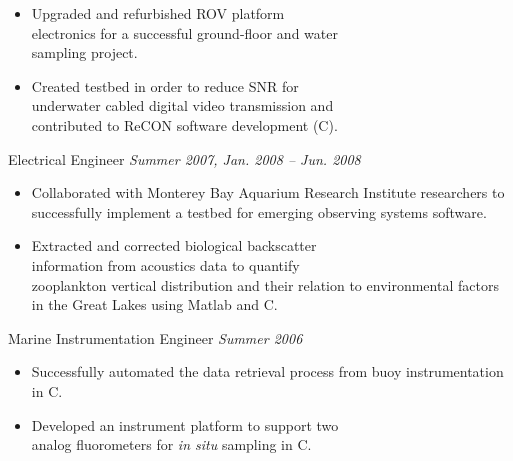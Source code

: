 \documentclass{article}
\begin{document}
{\begin{multicols}{2}
                \begin{itemize}[noitemsep,nolistsep]
                	\item Upgraded and refurbished ROV platform \\electronics for a successful ground-floor and water \\sampling project.
                	\item Created testbed in order to reduce SNR for \\underwater cabled digital video transmission and \\contributed to ReCON software development (C).
                \end{itemize}
                \vspace{5px}
                Electrical Engineer  \hfill \textsl{Summer 2007, Jan. 2008 -- Jun. 2008}  \\
                \vspace{ -10px}	
                \begin{itemize}[noitemsep,nolistsep]
                	\item Collaborated with Monterey Bay Aquarium Research Institute researchers to successfully implement a testbed for emerging observing systems software.
                	\item Extracted and corrected biological backscatter \\information from acoustics data to quantify \\zooplankton vertical distribution and their relation to environmental factors in the Great Lakes using Matlab and C.
                \end{itemize}
                \vspace{5px}
                Marine Instrumentation Engineer \hfill \textsl{Summer 2006} \\
                \vspace{ -10px}	
                \begin{itemize}[noitemsep,nolistsep]
                	\item Successfully automated the data retrieval process from buoy instrumentation in C. 
                	\item Developed an instrument platform to support two \\analog fluorometers for \textit{in situ} sampling in C. 
                \end{itemize}
                \vspace{5px}

\end{multicols}}
\end{document}
